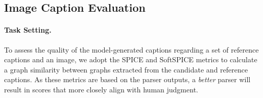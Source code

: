 \subsection{Image Caption Evaluation}
\begin{table}[t]
\centering
    \caption{ (Left) The correlation scores between SPICE or SoftSPICE with the human judgment. (Right) The accuracies of the metrics w.r.t. detecting the hallucinated sentences.
     \vspace{-3mm} }
  \label{tab:img_eval}
    \vspace{-3mm}
\end{table}
 \paragraph{Task Setting.} To assess the quality of the model-generated captions regarding a set of reference captions and an image, we adopt the SPICE and SoftSPICE metrics to calculate a graph similarity between graphs extracted from the candidate and reference captions. As these metrics are based on the parser outputs, a \textit{better} parser will result in scores that more closely align with human judgment. 
